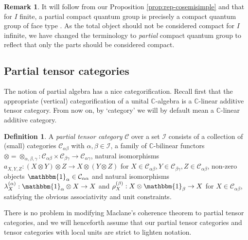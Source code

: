 \documentclass[10pt]{article}
\newcommand{\C}{\mathbb{C}}
\newcommand{\CatC}{\mathcal{C}}
\newcommand{\CatCC}{\mathscr{C}}
\newcommand{\Unitb}{\mathbbm{1}}
\theoremstyle{definition}
\newtheorem{Def}[Theorem]{Definition}
\newtheorem{Rem}[Theorem]{Remark}
\numberwithin{equation}{section}
\begin{document}
\begin{Rem} It will follow from our Proposition \ref{prop:rep-cosemisimple} and  \cite[Theorem 3.3 and Theorem 4.4]{Hay1} that for $I$ finite, a partial compact quantum group is precisely a compact quantum group of face type \cite[Definition 4.1]{Hay1}. As the total object should not be considered compact for $I$ infinite, we have changed the terminology to \emph{partial} compact quantum group to reflect that only the parts should be considered compact.
\end{Rem} 

\subsection{Partial tensor categories}\label{SecPartTen}

The notion of partial algebra has a nice categorification. Recall first that the appropriate (vertical) categorification of a unital $\C$-algebra is a $\C$-linear additive tensor category. From now on, by `category' we will by default mean a $\C$-linear additive category. 

\begin{Def} A \emph{partial tensor category} $\CatCC$ over a set $\mathscr{I}$ consists of  a collection of (small) categories $\mathcal{C}_{\alpha\beta}$ with $\alpha,\beta\in \mathscr{I}$, a family of $\C$-bilinear functors $\otimes = \otimes_{\alpha,\beta,\gamma}: \CatC_{\alpha\beta}\times \CatC_{\beta\gamma}\rightarrow \CatC_{\alpha\gamma}$, natural isomorphisms $a_{X,Y,Z}: (X\otimes Y)\otimes Z \rightarrow X\otimes (Y\otimes Z)$ for $X \in \CatC_{\alpha\beta},Y\in \CatC_{\beta\gamma},Z\in \CatC_{\alpha\beta}$, non-zero objects $\Unitb_{\alpha} \in \CatC_{\alpha\alpha}$ and natural isomorphisms $\lambda_X^{(\alpha)}:\Unitb_\alpha\otimes X \rightarrow X$ and $\rho_X^{(\beta)}:X\otimes \Unitb_\beta\rightarrow X$ for $X\in \CatC_{\alpha\beta}$, satisfying the obvious associativity and unit constraints. 
\end{Def}

There is no problem in modifying Maclane's coherence theorem to partial tensor categories, and we will henceforth assume that our partial tensor categories and tensor categories with local units are strict to lighten notation. 
\end{document}
